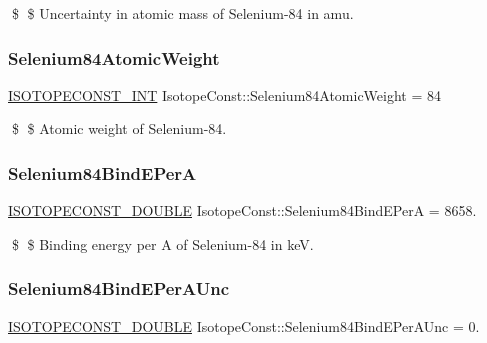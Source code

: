 \$ \$ Uncertainty in atomic mass of Selenium-\/84 in amu. \mbox{\label{group___isotope_const-_selenium-_se84_ga9cf2019579b5f0737d99c5fc2a1e8d9e}} 
\subsubsection{\texorpdfstring{Selenium84\+Atomic\+Weight}{Selenium84AtomicWeight}}
{\footnotesize\ttfamily \mbox{\hyperlink{group___isotope_const-_macros_ga5f18360b3e99483a35c32d789e62621c}{I\+S\+O\+T\+O\+P\+E\+C\+O\+N\+S\+T\+\_\+\+I\+NT}} Isotope\+Const\+::\+Selenium84\+Atomic\+Weight = 84}

\$ \$ Atomic weight of Selenium-\/84. \mbox{\label{group___isotope_const-_selenium-_se84_gae68f53695628b992bb6c9fba426c2758}} 
\subsubsection{\texorpdfstring{Selenium84\+Bind\+E\+PerA}{Selenium84BindEPerA}}
{\footnotesize\ttfamily \mbox{\hyperlink{group___isotope_const-_macros_ga8f45a7272ce02c0b4c65c44636ed719a}{I\+S\+O\+T\+O\+P\+E\+C\+O\+N\+S\+T\+\_\+\+D\+O\+U\+B\+LE}} Isotope\+Const\+::\+Selenium84\+Bind\+E\+PerA = 8658.}

\$ \$ Binding energy per A of Selenium-\/84 in keV. \mbox{\label{group___isotope_const-_selenium-_se84_gad83db7ca14818ae85a69591525d22a21}} 
\subsubsection{\texorpdfstring{Selenium84\+Bind\+E\+Per\+A\+Unc}{Selenium84BindEPerAUnc}}
{\footnotesize\ttfamily \mbox{\hyperlink{group___isotope_const-_macros_ga8f45a7272ce02c0b4c65c44636ed719a}{I\+S\+O\+T\+O\+P\+E\+C\+O\+N\+S\+T\+\_\+\+D\+O\+U\+B\+LE}} Isotope\+Const\+::\+Selenium84\+Bind\+E\+Per\+A\+Unc = 0.}

